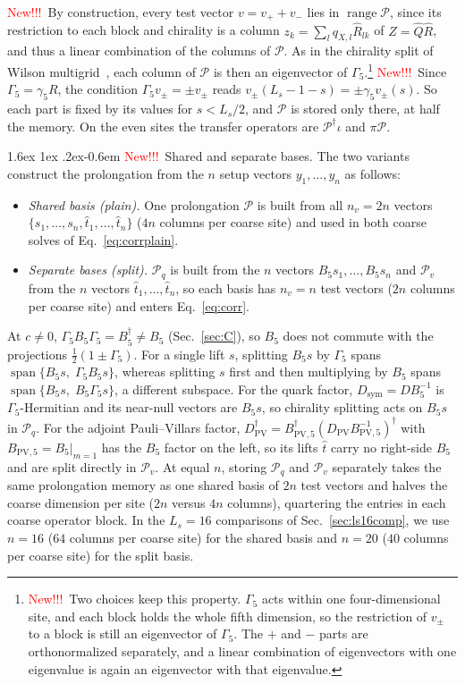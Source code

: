 \documentclass[11pt,a4paper]{article}
\makeatletter
\newif\ifshownew \shownewtrue
\DeclareRobustCommand\New{\ifshownew\textcolor{red}{New!!!}\ \else\ignorespaces\fi}
\renewcommand\paragraph{\@startsection{paragraph}{4}{\z@}%
  {1.6ex \@plus 1ex \@minus .2ex}{-0.6em}%
  {\normalfont\normalsize\itshape}}
\numberwithin{equation}{section}
\newcommand{\dg}{^{\dagger}}
\newcommand{\Dpv}{D_{\mathrm{PV}}}
\newcommand{\Gfive}{\Gamma_5}
\newcommand{\Pro}{\mathcal P}
\newcommand{\Pq}{\Pro_q}
\newcommand{\Pv}{\Pro_v}
\newcommand{\Dsym}{D_{\mathrm{sym}}}
\makeatother
\begin{document}
\New By construction, every test vector $v=v_++v_-$ lies in
$\operatorname{range}\Pro$, since its restriction to each block and chirality is a column
$z_k=\sum_l q_{X,l}\hat R_{lk}$ of $Z=\hat Q\hat R$, and thus a linear combination of the columns of $\Pro$.
As in the chirality split of Wilson multigrid~\cite{Babich}, each column of $\Pro$ is then an
eigenvector of $\Gfive$.\footnote{\New Two choices keep this property. $\Gfive$ acts within one
four-dimensional site, and each block holds the whole fifth dimension, so the restriction of
$v_\pm$ to a block is still an eigenvector of $\Gfive$. The $+$ and $-$ parts are orthonormalized
separately, and a linear combination of eigenvectors with one eigenvalue is again an eigenvector
with that eigenvalue.} \New Since $\Gfive=\gamma_5R$, the condition $\Gfive v_\pm=\pm v_\pm$ reads
$v_\pm(L_s-1-s)=\pm\gamma_5v_\pm(s)$. So each part is fixed by its values for $s<L_s/2$, and
$\Pro$ is stored only there, at half the memory. On the even sites the transfer operators are $\Pro\dg\iota$ and
$\pi\Pro$.

\paragraph{\New Shared and separate bases.} The two variants construct the prolongation from the
$n$ setup vectors $y_1,\dots,y_n$ as follows:
\begin{itemize}
\item \emph{Shared basis (plain).} One prolongation $\Pro$ is built from all $n_v=2n$ vectors
$\{s_1,\dots,s_n,\hat t_1,\dots,\hat t_n\}$ ($4n$ columns per coarse site) and used in both coarse
solves of Eq.~\eqref{eq:corrplain}.
\item \emph{Separate bases (split).} $\Pq$ is built from the $n$ vectors $B_5s_1,\dots,B_5s_n$ and
$\Pv$ from the $n$ vectors $\hat t_1,\dots,\hat t_n$, so each basis has $n_v=n$ test vectors ($2n$
columns per coarse site) and enters Eq.~\eqref{eq:corr}.
\end{itemize}
At $c\neq0$, $\Gfive B_5\Gfive=B_5\dg\neq B_5$ (Sec.~\ref{sec:C}), so $B_5$ does not commute with
the projections $\frac12(1\pm\Gfive)$. For a single lift $s$, splitting $B_5s$ by $\Gfive$ spans
$\operatorname{span}\{B_5s,\;\Gfive B_5s\}$, whereas splitting $s$ first and then multiplying by
$B_5$ spans $\operatorname{span}\{B_5s,\;B_5\Gfive s\}$, a different subspace. For the quark
factor, $\Dsym=DB_5^{-1}$ is $\Gfive$-Hermitian and its near-null vectors are $B_5s$, so chirality
splitting acts on $B_5s$ in $\Pq$. For the adjoint Pauli--Villars factor,
$\Dpv\dg=B_{\mathrm{PV},5}\dg(\Dpv B_{\mathrm{PV},5}^{-1})\dg$ with $B_{\mathrm{PV},5}=B_5|_{m=1}$
has the $B_5$ factor on the left, so its lifts $\hat t$ carry no right-side $B_5$ and are split
directly in $\Pv$. At equal $n$, storing $\Pq$ and $\Pv$ separately takes the same prolongation
memory as one shared basis of $2n$ test vectors and halves the coarse dimension per site ($2n$
versus $4n$ columns), quartering the entries in each coarse operator block. In the $L_s=16$
comparisons of Sec.~\ref{sec:ls16comp}, we use $n=16$ ($64$ columns per coarse site) for the
shared basis and $n=20$ ($40$ columns per coarse site) for the split basis.
\end{document}
